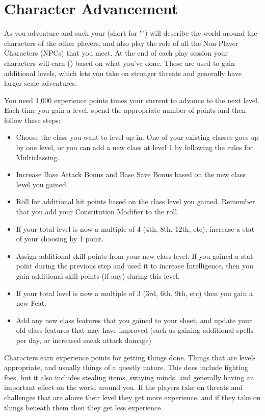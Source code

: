 \section{Character Advancement}

As you adventure and such your  (short for "") will describe the world around the characters of the other players, and also play the role of all the Non-Player Characters (NPCs) that you meet. At the end of each play session your characters will earn  () based on what you've done. These are used to gain additional levels, which lets you take on stronger threats and generally have larger scale adventures.

You need 1,000 experience points times your current  to advance to the next level. Each time you gain a level, spend the appropriate number of points and then follow these steps:

\begin{itemize}
\item Choose the class you want to level up in. One of your existing classes goes up by one level, or you can add a new class at level 1 by following the rules for Multiclassing.
\item Increase Base Attack Bonus and Base Save Bonus based on the new class level you gained.
\item Roll for additional hit points based on the class level you gained. Remember that you add your Constitution Modifier to the roll.
\item If your total level is now a multiple of 4 (4th, 8th, 12th, etc), increase a stat of your choosing by 1 point.
\item Assign additional skill points from your new class level. If you gained a stat point during the previous step and used it to increase Intelligence, then you gain additional skill points (if any) during this level.
\item If your total level is now a multiple of 3 (3rd, 6th, 9th, etc) then you gain a new Feat.
\item Add any new class features that you gained to your sheet, and update your old class features that may have improved (such as gaining additional spells per day, or increased sneak attack damage)
\end{itemize}

Characters earn experience points for getting things done. Things that are level-appropriate, and usually things of a questly nature. This does include fighting foes, but it also includes stealing items, swaying minds, and generally having an important effect on the world around you. If the players take on threats and challenges that are above their level they get more experience, and if they take on things beneath them then they get less experience. 


